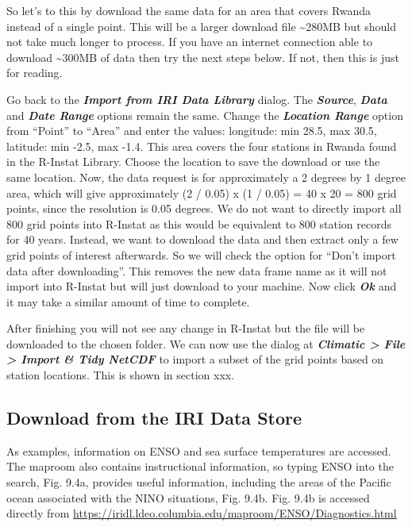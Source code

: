 \documentclass[
  letterpaper,
  DIV=11,
  numbers=noendperiod]{scrreprt}
\begin{document}
So let's to this by download the same data for an area that covers
Rwanda instead of a single point. This will be a larger download file
\textasciitilde280MB but should not take much longer to process. If you
have an internet connection able to download \textasciitilde300MB of
data then try the next steps below. If not, then this is just for
reading.

Go back to the \textbf{\emph{Import from IRI Data Library}} dialog. The
\textbf{\emph{Source}}, \textbf{\emph{Data}} and \textbf{\emph{Date
Range}} options remain the same. Change the \textbf{\emph{Location
Range}} option from ``Point'' to ``Area'' and enter the values:
longitude: min 28.5, max 30.5, latitude: min -2.5, max -1.4. This area
covers the four stations in Rwanda found in the R-Instat Library. Choose
the location to save the download or use the same location. Now, the
data request is for approximately a 2 degrees by 1 degree area, which
will give approximately (2 / 0.05) x (1 / 0.05) = 40 x 20 = 800 grid
points, since the resolution is 0.05 degrees. We do not want to directly
import all 800 grid points into R-Instat as this would be equivalent to
800 station records for 40 years. Instead, we want to download the data
and then extract only a few grid points of interest afterwards. So we
will check the option for ``Don't import data after downloading''. This
removes the new data frame name as it will not import into R-Instat but
will just download to your machine. Now click \textbf{\emph{Ok}} and it
may take a similar amount of time to complete.

After finishing you will not see any change in R-Instat but the file
will be downloaded to the chosen folder. We can now use the dialog at
\textbf{\emph{Climatic \textgreater{} File \textgreater{} Import \& Tidy
NetCDF}} to import a subset of the grid points based on station
locations. This is shown in section xxx.

\subsection{Download from the IRI Data
Store}\label{download-from-the-iri-data-store}

As examples, information on ENSO and sea surface temperatures are
accessed. The maproom also contains instructional information, so typing
ENSO into the search, Fig. 9.4a, provides useful information, including
the areas of the Pacific ocean associated with the NINO situations, Fig.
9.4b. Fig. 9.4b is accessed directly from
\href{https://iridl.ldeo.columbia.edu/maproom/ENSO/Diagnostics.html}{\ul{https://iridl.ldeo.columbia.edu/maproom/ENSO/Diagnostics.html}}
\end{document}

